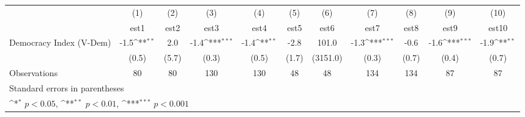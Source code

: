 {
\def\sym#1{\ifmmode^{#1}\else\(^{#1}\)\fi}
\begin{tabular}{l*{10}{c}}
\hline\hline
                    &\multicolumn{1}{c}{(1)}         &\multicolumn{1}{c}{(2)}         &\multicolumn{1}{c}{(3)}         &\multicolumn{1}{c}{(4)}         &\multicolumn{1}{c}{(5)}         &\multicolumn{1}{c}{(6)}         &\multicolumn{1}{c}{(7)}         &\multicolumn{1}{c}{(8)}         &\multicolumn{1}{c}{(9)}         &\multicolumn{1}{c}{(10)}         \\
                    &        est1         &        est2         &        est3         &        est4         &        est5         &        est6         &        est7         &        est8         &        est9         &       est10         \\
\hline
Democracy Index (V-Dem)&        -1.5\sym{**} &         2.0         &        -1.4\sym{***}&        -1.4\sym{**} &        -2.8         &       101.0         &        -1.3\sym{***}&        -0.6         &        -1.6\sym{***}&        -1.9\sym{**} \\
                    &       (0.5)         &       (5.7)         &       (0.3)         &       (0.5)         &       (1.7)         &    (3151.0)         &       (0.3)         &       (0.7)         &       (0.4)         &       (0.7)         \\
\hline
Observations        &          80         &          80         &         130         &         130         &          48         &          48         &         134         &         134         &          87         &          87         \\
\hline\hline
\multicolumn{11}{l}{\footnotesize Standard errors in parentheses}\\
\multicolumn{11}{l}{\footnotesize \sym{*} \(p<0.05\), \sym{**} \(p<0.01\), \sym{***} \(p<0.001\)}\\
\end{tabular}
}
